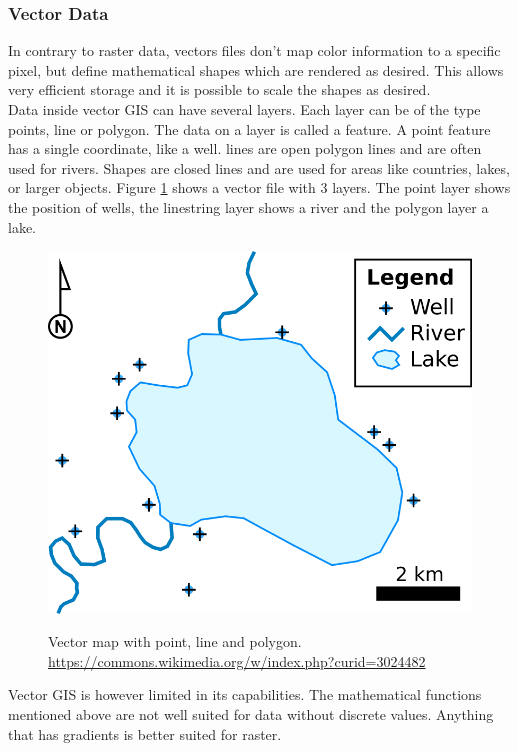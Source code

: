 \subsubsection{Vector Data}
In contrary to raster data, vectors files don't map color information to a specific pixel, but define mathematical shapes which are rendered as desired. This allows very efficient storage and it is possible to scale the shapes as desired.\\
Data inside vector GIS can have several layers. Each layer can be of the type points, line or polygon. The data on a layer is called a feature. A point feature has a single coordinate, like a well. lines are open polygon lines and are often used for rivers. Shapes are closed lines and are used for areas like countries, lakes, or larger objects. Figure \ref{img:vector} shows a vector file with 3 layers. The point layer shows the position of wells, the linestring layer shows a river and the polygon layer a lake. \\
\begin{figure}[H]
	\centering
	\includegraphics[width=0.4\columnwidth]{res/vector-map}\\
	\caption[]{Vector map with point, line and polygon. \url{https://commons.wikimedia.org/w/index.php?curid=3024482}}
	\label{img:vector}
\end{figure}

Vector GIS is however limited in its capabilities. The mathematical functions mentioned above are not well suited for data without discrete values. Anything that has gradients is better suited for raster.



%
%
%
